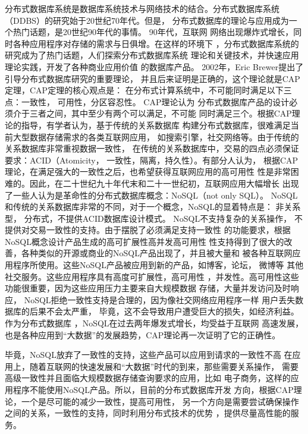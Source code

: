 分布式数据库系统是数据库系统技术与网络技术的结合。分布式数据库系统（DDBS）的研究始于20世纪70年代。但是，
分布式数据库的理论与应用成为一个热门话题，是20世纪90年代的事情。
 90年代，互联网
网络出现爆炸式增长，同时各种应用程序对存储的需求与日俱增。在这样的环境下
，分布式数据库系统的研究成为了热门话题，人们探索分布式数据库系统
理论和关键技术，并快速应用理论实践，开发了各种商业应用价值
的数据库产品。 2002年，Eric Brewer提出了引导分布式数据库研究的重要理论，
并且后来证明是正确的，这个理论就是CAP定理，CAP定理的核心观点是：
在分布式计算系统中，不可能同时满足以下三点：一致性，
可用性，分区容忍性。 CAP理论认为
分布式数据库产品的设计必须介于三者之间，其中至少有两个可以满足，不可能
同时满足三个。根据CAP理论的指导，有学者认为，基于传统的关系数据库
构建分布式数据库，很难满足当前大型数据存储需求的各类互联网应用，
如搜索引擎，社交网络等。由于传统的关系数据库非常重视数据一致性，
在传统的关系数据库中，交易的四点必须保证要求：ACID（Atomicity，
一致性，隔离，持久性）。有部分人认为，
根据CAP理论，在满足强大的一致性之后，也希望获得互联网应用的高可用性
性是非常困难的。因此，在二十世纪九十年代末和二十一世纪初，互联网应用大幅增长
出现了一些人认为是革命性的分布式数据库概念：NoSQL（not only SQL）。
NoSQL和传统的关系数据库非常的不同，对于一个概念，NoSQL的显着特点是：
非关系型，
分布式，不提供ACID数据库设计模式。 NoSQL不支持复杂的关系操作，
不提供对交易一致性的支持。由于摆脱了必须满足支持一致性
的功能要求，根据NoSQL概念设计产品生成的高可扩展性高并发高可用性
性支持得到了很大的改善，各种类似的开源或商业的NoSQL产品出现了，并且被大量和
被各种互联网应用程序所使用。这些NoSQL产品被应用到新的产品，如博客，论坛，
微博等
其他社交服务。这些应用程序具有高度可扩展性，高可用性
，并发性。高可用性这些功能很重要，因为这些应用压力主要来自大规模数据
存储，大量并发访问及时响应，
NoSQL拒绝一致性支持是合理的，因为像社交网络应用程序一样
用户丢失数据库的后果不会太严重，
毕竟，这不会导致用户遭受巨大的损失，如经济利益。作为分布式数据库
，NoSQL在过去两年爆发式增长，均受益于互联网
高速发展，也是各种应用到“大数据”的发展趋势，CAP理论再一次证明了它的正确性。

毕竟，NoSQL放弃了一致性的支持，这些产品可以应用到请求的一致性不高
在应用上，随着互联网的快速发展和“大数据”时代的到来，那些需要关系操作，
需要高级一致性并且面临大规模数据存储查询要求的应用，比如
电子商务，这样的应用程序不能使用NoSQL产品。所以，目前的分布式数据库开发
方向，根据CAP理论，一个是尽可能的减少一致性，提高可用性，
另一个方向是需要尝试确保操作之间的关系，一致性的支持，同时利用分布式技术的优势
，提供尽量高性能的服务。
